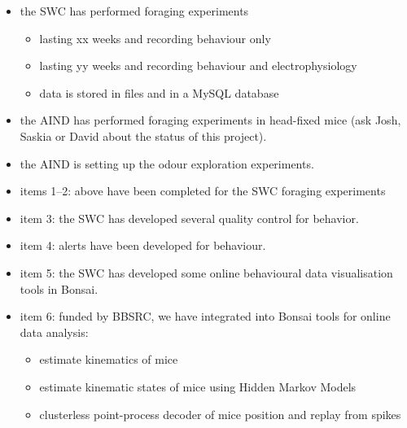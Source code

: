 \begin{itemize}

    \item the SWC has performed foraging experiments

    \begin{itemize}

        \item lasting xx weeks and recording behaviour only
        \item lasting yy weeks and recording behaviour and electrophysiology
        \item data is stored in files and in a MySQL database

    \end{itemize}

    \item the AIND has performed foraging experiments in head-fixed mice (ask Josh, Saskia or David about the status of this project).

    \item the AIND is setting up the odour exploration experiments.

    \item  items 1--2: above have been completed for the SWC foraging experiments

    \item item 3: the SWC has developed several quality control for behavior.

    \item item 4: alerts have been developed for behaviour.

    \item  item 5: the SWC has developed some online behavioural data
        visualisation tools in Bonsai.

    \item  item 6: funded by BBSRC, we have integrated into Bonsai tools for online data
  analysis:

    \begin{itemize}

        \item estimate kinematics of mice

        \item estimate kinematic states of mice using Hidden Markov Models

        \item clusterless point-process decoder of mice position and replay from spikes

    \end{itemize}


\end{itemize}
